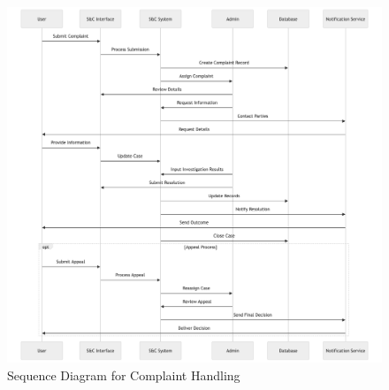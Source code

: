 \begin{figure}[H]
    \begin{center}
        \includegraphics[width=1\linewidth]{JhaBhatiaSharma/Images/Sequence Diagrams/ComplaintHandling.png}
        \caption{Sequence Diagram for Complaint Handling}
        \label{fig:ComplainHandling}%
    \end{center}
\end{figure}


